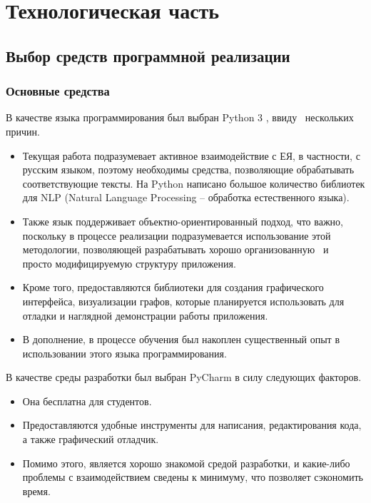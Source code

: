 \section{Технологическая часть}
\subsection{Выбор средств программной реализации}
\subsubsection{Основные средства}
В качестве языка программирования был выбран Python 3 \cite{python}, ввиду \, нескольких причин.
\begin{itemize}
	\item Текущая работа подразумевает активное взаимодействие с ЕЯ, в частности, с русским языком, поэтому необходимы средства, позволяющие обрабатывать соответствующие тексты. На Python написано большое количество библиотек для NLP (Natural Language Processing -- обработка естественного языка).
	\item Также язык поддерживает объектно-ориентированный подход, что важно, поскольку в процессе реализации подразумевается использование этой методологии, позволяющей разрабатывать хорошо организованную \, и \, просто модифицируемую структуру приложения.
	\item Кроме того, предоставляются библиотеки для создания графического интерфейса, визуализации графов, которые планируется использовать для отладки и наглядной демонстрации работы приложения.
	\item В дополнение, в процессе обучения был накоплен существенный опыт в использовании этого языка программирования. \newline
\end{itemize}
%
В качестве среды разработки был выбран PyCharm \cite{pycharm} в силу следующих факторов.
\begin{itemize}
	\item Она бесплатна для студентов.
	\item Предоставляются удобные инструменты для написания, редактирования кода, а также графический отладчик.
	\item Помимо этого, является хорошо знакомой средой разработки, и какие-либо проблемы с взаимодействием сведены к минимуму, что позволяет сэкономить время.
\end{itemize}

